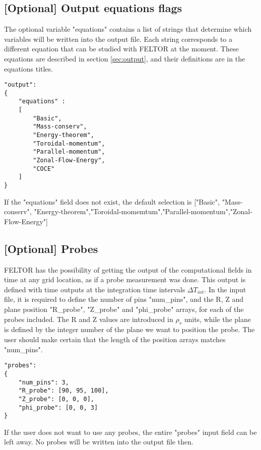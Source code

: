 \subsection{[Optional] Output equations flags}\label{sec:output_flags}
The optional variable "equations" contains a list of strings that
determine which variables will be written into the output file.
Each string
corresponds to a different equation that can be studied with FELTOR at the
moment. These equations are described in section \ref{sec:output}, and their
definitions are in the equations titles.
\begin{verbatim}
"output":
{
    "equations" :
    [
        "Basic",
        "Mass-conserv",
        "Energy-theorem",
        "Toroidal-momentum",
        "Parallel-momentum",
        "Zonal-Flow-Energy",
        "COCE"
    ]
}
\end{verbatim}
\begin{tcolorbox}[title=Note]
    If the "equations" field does not exist, the default selection is ["Basic", "Mass-conserv", "Energy-theorem","Toroidal-momemtum","Parallel-momentum","Zonal-Flow-Energy"]
\end{tcolorbox}

\subsection{[Optional] Probes}
FELTOR has the possibility of getting the output of the computational fields in time at any grid location, as if a probe measurement was done. This output is defined with time outputs at the integration time intervals $\Delta T_{int}$. In the input file, it is required to define the number of pins "num\_pins", and the R, Z and plane position "R\_probe", "Z\_probe" and "phi\_probe" arrays, for each of the probes included. The R and Z values are introduced in $\rho_s$ units, while the plane is defined by the integer number of the plane we want to position the probe. The user should make certain that the length of the position arrays matches "num\_pins".
\begin{verbatim}
"probes":
{
    "num_pins": 3,
    "R_probe": [90, 95, 100],
    "Z_probe": [0, 0, 0],
    "phi_probe": [0, 0, 3]
}
\end{verbatim}
\begin{tcolorbox}[title=Note]
 If the user does not want to use any probes, the entire "probes" input field can be left away. No probes will be written into the output file then.
\end{tcolorbox}
